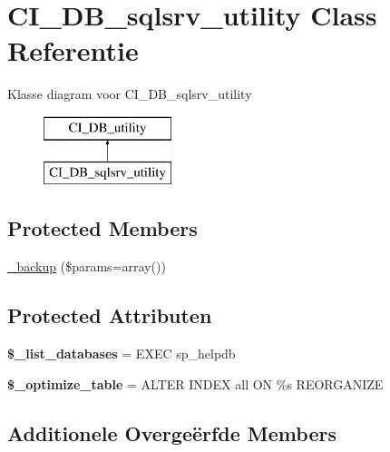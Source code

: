 \hypertarget{class_c_i___d_b__sqlsrv__utility}{}\section{C\+I\+\_\+\+D\+B\+\_\+sqlsrv\+\_\+utility Class Referentie}
\label{class_c_i___d_b__sqlsrv__utility}
Klasse diagram voor C\+I\+\_\+\+D\+B\+\_\+sqlsrv\+\_\+utility\begin{figure}[H]
\begin{center}
\leavevmode
\includegraphics[height=2.000000cm]{class_c_i___d_b__sqlsrv__utility}
\end{center}
\end{figure}
\subsection*{Protected Members}
\begin{DoxyCompactItemize}
\item 
\mbox{\hyperlink{class_c_i___d_b__sqlsrv__utility_a30f3053d2c82e7562349924363507afa}{\+\_\+backup}} (\$params=array())
\end{DoxyCompactItemize}
\subsection*{Protected Attributen}
\begin{DoxyCompactItemize}
\item 
\mbox{\label{class_c_i___d_b__sqlsrv__utility_afe3a5b80562d93d6bc7e2b53c95b7e5a}} 
{\bfseries \$\+\_\+list\+\_\+databases} = \textquotesingle{}E\+X\+EC sp\+\_\+helpdb\textquotesingle{}
\item 
\mbox{\label{class_c_i___d_b__sqlsrv__utility_a083199e5c22c78912dae0a47bb2d7fad}} 
{\bfseries \$\+\_\+optimize\+\_\+table} = \textquotesingle{}A\+L\+T\+ER I\+N\+D\+EX all ON \%s R\+E\+O\+R\+G\+A\+N\+I\+ZE\textquotesingle{}
\end{DoxyCompactItemize}
\subsection*{Additionele Overge\"{e}rfde Members}


